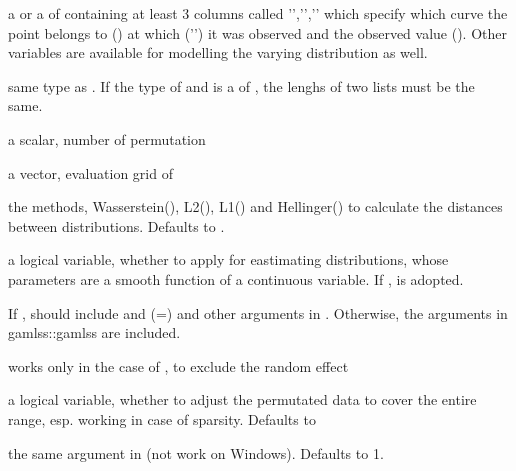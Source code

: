 \documentclass[a4paper]{book}
\begin{document}
%
\begin{Arguments}
\begin{ldescription}
\item[\code{ydata1}] a  or a  of  containing 
at least 3 columns called '','','' which 
specify which curve the point belongs to () at which ('') 
it was observed and the observed value (). Other variables are 
available for modelling the varying distribution as well.

\item[\code{ydata2}] same type as . If the type of  and 
is a  of , the lenghs of two lists must be the same.

\item[\code{nperm}] a scalar, number of permutation

\item[\code{eval.index.grid}] a vector, evaluation grid of 

\item[\code{dist.method}] the methods, Wasserstein(), L2(), 
L1() and Hellinger() to calculate the distances between 
distributions. Defaults to .

\item[\code{mgcv.gam}] a logical variable, whether to apply  for eastimating 
distributions, whose parameters are a smooth function of a continuous variable. If 
,  is adopted.

\item[\code{...}] If ,  should include  and 
(=) and other arguments in . Otherwise, 
the arguments in gamlss::gamlss are included.

\item[\code{exclude}] works only in the case of , to exclude the random effect

\item[\code{permadj}] a logical variable, whether to adjust the permutated data to cover the entire range,
esp. working in case of sparsity. Defaults to 

\item[\code{mc.cores}] the same argument in  (not work on Windows). Defaults to 1.
\end{ldescription}
\end{Arguments}
\end{document}
